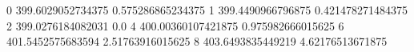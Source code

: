0 399.6029052734375 0.575286865234375
1 399.4490966796875 0.421478271484375
2 399.0276184082031 0.0
4 400.00360107421875 0.975982666015625
6 401.5452575683594 2.51763916015625
8 403.6493835449219 4.62176513671875
